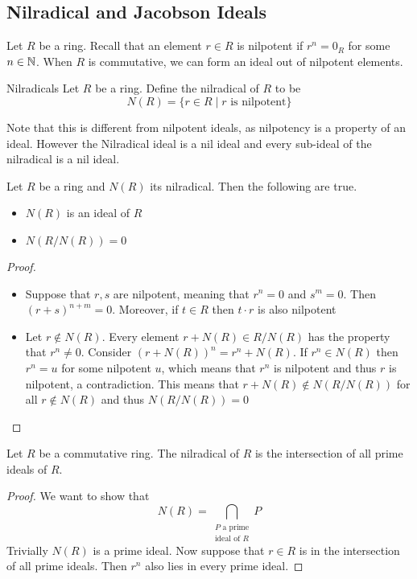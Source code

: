 \documentclass[a4paper]{article}
\begin{document}
\subsection{Nilradical and Jacobson Ideals}
Let $R$ be a ring. Recall that an element $r\in R$ is nilpotent if $r^n=0_R$ for some $n\in\mathbb{N}$. When $R$ is commutative, we can form an ideal out of nilpotent elements. 

\begin{defn}{Nilradicals}{} Let $R$ be a ring. Define the nilradical of $R$ to be $$N(R)=\{r\in R\;|\;r\text{ is nilpotent}\}$$
\end{defn}

Note that this is different from nilpotent ideals, as nilpotency is a property of an ideal. However the Nilradical ideal is a nil ideal and every sub-ideal of the nilradical is a nil ideal. 

\begin{prp}{}{} Let $R$ be a ring and $N(R)$ its nilradical. Then the following are true. 
\begin{itemize}
\item $N(R)$ is an ideal of $R$
\item $N(R/N(R))=0$
\end{itemize}\tcbline
\begin{proof}~\\
\begin{itemize}
\item Suppose that $r,s$ are nilpotent, meaning that $r^n=0$ and $s^m=0$. Then $(r+s)^{n+m}=0$. Moreover, if $t\in R$ then $t\cdot r$ is also nilpotent
\item Let $r\notin N(R)$. Every element $r+N(R)\in R/N(R)$ has the property that $r^n\neq 0$. Consider $(r+N(R))^n=r^n+N(R)$. If $r^n\in N(R)$ then $r^n=u$ for some nilpotent $u$, which means that $r^n$ is nilpotent and thus $r$ is nilpotent, a contradiction. This means that $r+N(R)\notin N(R/N(R))$ for all $r\notin N(R)$ and thus $N(R/N(R))=0$
\end{itemize}
\end{proof}
\end{prp}

\begin{prp}{}{} Let $R$ be a commutative ring. The nilradical of $R$ is the intersection of all prime ideals of $R$. \tcbline
\begin{proof}
We want to show that $$N(R)=\bigcap_{\substack{P\text{ a prime}\\\text{ideal of }R}}P$$
Trivially $N(R)$ is a prime ideal. Now suppose that $r\in R$ is in the intersection of all prime ideals. Then $r^n$ also lies in every prime ideal. 
\end{proof}
\end{prp}
\end{document}
